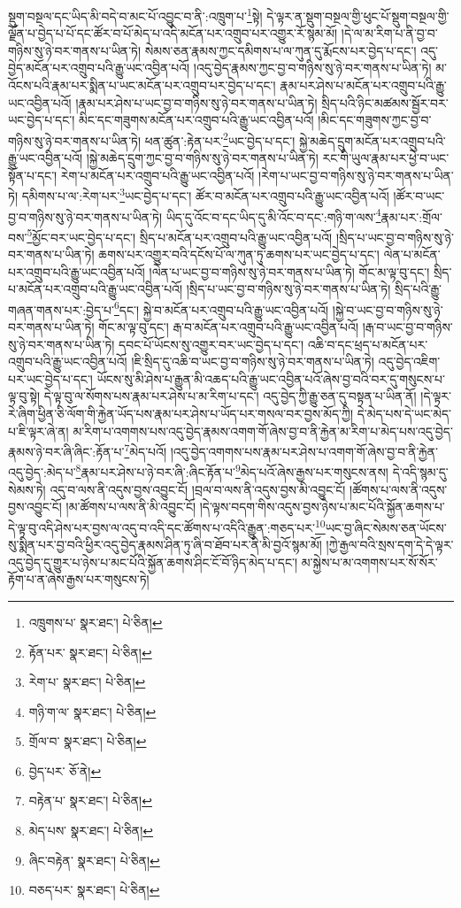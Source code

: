 སྡུག་བསྔལ་དང་ཡིད་མི་བདེ་བ་མང་པོ་འབྱུང་བ་ནི་:འཁྲུག་པ་\footnote{འཁྲུགས་པ་  སྣར་ཐང་།  པེ་ཅིན། }སྟེ། དེ་ལྟར་ན་སྡུག་བསྔལ་གྱི་ཕུང་པོ་སྡུག་བསྔལ་གྱི་ལྗོན་པ་བྱེད་པ་པོ་དང་ཚོར་བ་པོ་མེད་པ་འདི་མངོན་པར་འགྲུབ་པར་འགྱུར་རོ་སྙམ་མོ། །དེ་ལ་མ་རིག་པ་ནི་བྱ་བ་གཉིས་སུ་ཉེ་བར་གནས་པ་ཡིན་ཏེ། སེམས་ཅན་རྣམས་ཀྱང་དམིགས་པ་ལ་ཀུན་དུ་རྨོངས་པར་བྱེད་པ་དང་། འདུ་བྱེད་མངོན་པར་འགྲུབ་པའི་རྒྱུ་ཡང་འབྱིན་པའོ། །འདུ་བྱེད་རྣམས་ཀྱང་བྱ་བ་གཉིས་སུ་ཉེ་བར་གནས་པ་ཡིན་ཏེ། མ་འོངས་པའི་རྣམ་པར་སྨིན་པ་ཡང་མངོན་པར་འགྲུབ་པར་བྱེད་པ་དང་། རྣམ་པར་ཤེས་པ་མངོན་པར་འགྲུབ་པའི་རྒྱུ་ཡང་འབྱིན་པའོ། །རྣམ་པར་ཤེས་པ་ཡང་བྱ་བ་གཉིས་སུ་ཉེ་བར་གནས་པ་ཡིན་ཏེ། སྲིད་པའི་ཉིང་མཚམས་སྦྱོར་བར་ཡང་བྱེད་པ་དང་། མིང་དང་གཟུགས་མངོན་པར་འགྲུབ་པའི་རྒྱུ་ཡང་འབྱིན་པའོ། །མིང་དང་གཟུགས་ཀྱང་བྱ་བ་གཉིས་སུ་ཉེ་བར་གནས་པ་ཡིན་ཏེ། ཕན་ཚུན་:རྟེན་པར་\footnote{རྟོན་པར་  སྣར་ཐང་།  པེ་ཅིན། }ཡང་བྱེད་པ་དང་། སྐྱེ་མཆེད་དྲུག་མངོན་པར་འགྲུབ་པའི་རྒྱུ་ཡང་འབྱིན་པའོ། །སྐྱེ་མཆེད་དྲུག་ཀྱང་བྱ་བ་གཉིས་སུ་ཉེ་བར་གནས་པ་ཡིན་ཏེ། རང་གི་ཡུལ་རྣམ་པར་ཕྱེ་བ་ཡང་སྟོན་པ་དང་། རེག་པ་མངོན་པར་འགྲུབ་པའི་རྒྱུ་ཡང་འབྱིན་པའོ། །རེག་པ་ཡང་བྱ་བ་གཉིས་སུ་ཉེ་བར་གནས་པ་ཡིན་ཏེ། དམིགས་པ་ལ་:རེག་པར་\footnote{རེག་པ་  སྣར་ཐང་།  པེ་ཅིན། }ཡང་བྱེད་པ་དང་། ཚོར་བ་མངོན་པར་འགྲུབ་པའི་རྒྱུ་ཡང་འབྱིན་པའོ། །ཚོར་བ་ཡང་བྱ་བ་གཉིས་སུ་ཉེ་བར་གནས་པ་ཡིན་ཏེ། ཡིད་དུ་འོང་བ་དང་ཡིད་དུ་མི་འོང་བ་དང་:གཉི་ག་ལས་\footnote{གཉི་ག་ལ་  སྣར་ཐང་།  པེ་ཅིན། }རྣམ་པར་:གྲོལ་བས་\footnote{གྲོལ་བ་  སྣར་ཐང་།  པེ་ཅིན། }མྱོང་བར་ཡང་བྱེད་པ་དང་། སྲིད་པ་མངོན་པར་འགྲུབ་པའི་རྒྱུ་ཡང་འབྱིན་པའོ། །སྲིད་པ་ཡང་བྱ་བ་གཉིས་སུ་ཉེ་བར་གནས་པ་ཡིན་ཏེ། ཆགས་པར་འགྱུར་བའི་དངོས་པོ་ལ་ཀུན་ཏུ་ཆགས་པར་ཡང་བྱེད་པ་དང་། ལེན་པ་མངོན་པར་འགྲུབ་པའི་རྒྱུ་ཡང་འབྱིན་པའོ། །ལེན་པ་ཡང་བྱ་བ་གཉིས་སུ་ཉེ་བར་གནས་པ་ཡིན་ཏེ། གོང་མ་ལྟ་བུ་དང་། སྲིད་པ་མངོན་པར་འགྲུབ་པའི་རྒྱུ་ཡང་འབྱིན་པའོ། །སྲིད་པ་ཡང་བྱ་བ་གཉིས་སུ་ཉེ་བར་གནས་པ་ཡིན་ཏེ། སྲིད་པའི་རྒྱུ་གཞན་གནས་པར་:བྱེད་པ་\footnote{བྱེད་པར་  ཅོ་ནེ། }དང་། སྐྱེ་བ་མངོན་པར་འགྲུབ་པའི་རྒྱུ་ཡང་འབྱིན་པའོ། །སྐྱེ་བ་ཡང་བྱ་བ་གཉིས་སུ་ཉེ་བར་གནས་པ་ཡིན་ཏེ། གོང་མ་ལྟ་བུ་དང་། རྒ་བ་མངོན་པར་འགྲུབ་པའི་རྒྱུ་ཡང་འབྱིན་པའོ། །རྒ་བ་ཡང་བྱ་བ་གཉིས་སུ་ཉེ་བར་གནས་པ་ཡིན་ཏེ། དབང་པོ་ཡོངས་སུ་འགྱུར་བར་ཡང་བྱེད་པ་དང་། འཆི་བ་དང་ཕྲད་པ་མངོན་པར་འགྲུབ་པའི་རྒྱུ་ཡང་འབྱིན་པའོ། །ཇི་སྲིད་དུ་འཆི་བ་ཡང་བྱ་བ་གཉིས་སུ་ཉེ་བར་གནས་པ་ཡིན་ཏེ། འདུ་བྱེད་འཇིག་པར་ཡང་བྱེད་པ་དང་། ཡོངས་སུ་མི་ཤེས་པ་རྒྱུན་མི་འཆད་པའི་རྒྱུ་ཡང་འབྱིན་པའོ་ཞེས་བྱ་བའི་བར་དུ་གསུངས་པ་ལྟ་བུ་སྟེ། དེ་ལྟ་བུ་ལ་སོགས་པས་རྣམ་པར་ཤེས་པ་མ་རིག་པ་དང་། འདུ་བྱེད་ཀྱི་རྒྱུ་ཅན་དུ་བསྟན་པ་ཡིན་ནོ། །དེ་ལྟར་རེ་ཞིག་ཕྱིན་ཅི་ལོག་གི་རྐྱེན་ཡོད་པས་རྣམ་པར་ཤེས་པ་ཡོད་པར་གསལ་བར་བྱས་མོད་ཀྱི། དེ་མེད་པས་དེ་ཡང་མེད་པ་ཇི་ལྟར་ཞེ་ན། མ་རིག་པ་འགགས་པས་འདུ་བྱེད་རྣམས་འགག་གོ་ཞེས་བྱ་བ་ནི་རྐྱེན་མ་རིག་པ་མེད་པས་འདུ་བྱེད་རྣམས་ཉེ་བར་ཞི་ཞིང་:རྟོན་པ་\footnote{བརྟེན་པ་  སྣར་ཐང་།  པེ་ཅིན། }མེད་པའོ། །འདུ་བྱེད་འགགས་པས་རྣམ་པར་ཤེས་པ་འགག་གོ་ཞེས་བྱ་བ་ནི་རྐྱེན་འདུ་བྱེད་:མེད་པ་\footnote{མེད་པས་  སྣར་ཐང་།  པེ་ཅིན། }རྣམ་པར་ཤེས་པ་ཉེ་བར་ཞི་:ཞིང་རྟོན་པ་\footnote{ཞིང་བརྟེན་  སྣར་ཐང་།  པེ་ཅིན། }མེད་པའོ་ཞེས་རྒྱས་པར་གསུངས་ནས། དེ་འདི་སྙམ་དུ་སེམས་ཏེ། འདུ་བ་ལས་ནི་འདུས་བྱས་འབྱུང་ངོ། །བྲལ་བ་ལས་ནི་འདུས་བྱས་མི་འབྱུང་ངོ། །ཚོགས་པ་ལས་ནི་འདུས་བྱས་འབྱུང་ངོ། །མ་ཚོགས་པ་ལས་ནི་མི་འབྱུང་ངོ། །དེ་ལྟས་བདག་གིས་འདུས་བྱས་ཉེས་པ་མང་པོའི་སྐྱོན་ཆགས་པ་དེ་ལྟ་བུ་འདི་ཤེས་པར་བྱས་ལ་འདུ་བ་འདི་དང་ཚོགས་པ་འདིའི་རྒྱུན་:གཅད་པར་\footnote{བཅད་པར་  སྣར་ཐང་།  པེ་ཅིན། }ཡང་བྱ་ཞིང་སེམས་ཅན་ཡོངས་སུ་སྨིན་པར་བྱ་བའི་ཕྱིར་འདུ་བྱེད་རྣམས་ཤིན་ཏུ་ཞི་བ་ཐོབ་པར་ནི་མི་བྱའོ་སྙམ་མོ། །ཀྱེ་རྒྱལ་བའི་སྲས་དག་དེ་དེ་ལྟར་འདུ་བྱེད་དུ་གྱུར་པ་ཉེས་པ་མང་པོའི་སྐྱོན་ཆགས་ཤིང་ངོ་བོ་ཉིད་མེད་པ་དང་། མ་སྐྱེས་པ་མ་འགགས་པར་སོ་སོར་རྟོག་པ་ན་ཞེས་རྒྱས་པར་གསུངས་ཏེ། 